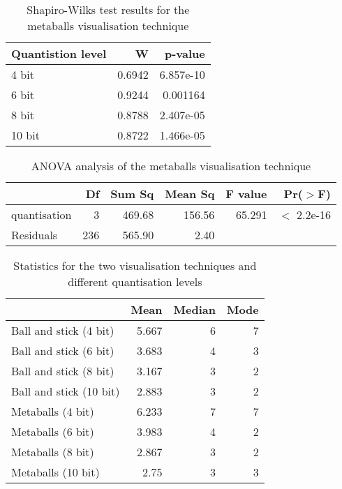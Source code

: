 \begin{table}[h!]
  \begin{tabular}{ | l | r | r | }
  \hline
  Quantistion level &      W &   p-value  \\ \hline
  4 bit             & 0.6942 & 6.857e-10  \\ \hline
  6 bit             & 0.9244 &  0.001164  \\ \hline
  8 bit             & 0.8788 & 2.407e-05  \\ \hline
  10 bit            & 0.8722 & 1.466e-05  \\ \hline
  \end{tabular}
  \caption{Shapiro-Wilks test results for the metaballs visualisation
  technique}
  \label{tab:metaballs_normality}
\end{table}


\begin{table}[h!]
  \begin{tabular}{ | l | r | r | r | r | r | }
  \hline
               &  Df & Sum Sq & Mean Sq & F value &    Pr($>$F)  \\ \hline
  quantisation &   3 & 469.68 &  156.56 &  65.291 & $<$ 2.2e-16  \\ \hline
  Residuals    & 236 & 565.90 &    2.40 &         &              \\ \hline
  \end{tabular}
  \caption{ANOVA analysis of the metaballs visualisation technique}
  \label{tab:metaballs_anova}
\end{table}



\begin{table}[h!]
  \begin{tabular}{ | l | r | r | r | }
  \hline
                          &  Mean & Median & Mode  \\ \hline
  Ball and stick (4 bit)  & 5.667 &      6 &    7  \\ \hline
  Ball and stick (6 bit)  & 3.683 &      4 &    3  \\ \hline
  Ball and stick (8 bit)  & 3.167 &      3 &    2  \\ \hline
  Ball and stick (10 bit) & 2.883 &      3 &    2  \\ \hline
  Metaballs (4 bit)       & 6.233 &      7 &    7  \\ \hline
  Metaballs (6 bit)       & 3.983 &      4 &    2  \\ \hline
  Metaballs (8 bit)       & 2.867 &      3 &    2  \\ \hline
  Metaballs (10 bit)      &  2.75 &      3 &    3  \\ \hline
  \end{tabular}
  \caption{Statistics for the two visualisation techniques and different
  quantisation levels}
  \label{tab:experiment_statistics}
\end{table}



